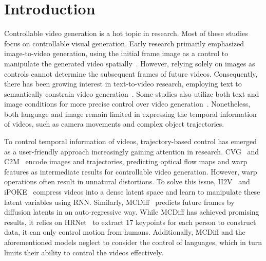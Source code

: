 \documentclass{article} %
\begin{document}
\section{Introduction}

Controllable video generation is a hot topic in research. Most of these studies focus on controllable visual generation. Early research primarily emphasized image-to-video generation, using the initial frame image as a control to manipulate the generated video spatially~\citet{lotterDeepPredictiveCoding2016,srivastavaUnsupervisedLearningVideo2015,chiappaRecurrentEnvironmentSimulators2016}. However, relying solely on images as controls cannot determine the subsequent frames of future videos. Consequently, there has been growing interest in text-to-video research, employing text to semantically constrain video generation~\citet{wuGODIVAGeneratingOpenDomaIn2021,wuUWAVisualSynthesis2022,hongCogVideoLargescalePretraining2022,singerMakeAVideoTexttoVideoGeneration2022,hoImagenVideoHigh2022}. Some studies also utilize both text and image conditions for more precise control over video generation~\citet{huMakeItMove2022,yinNUWAXLDiffusionDiffusion2023,esserStructureContentguidedVideo2023}. Nonetheless, both language and image remain limited in expressing the temporal information of videos, such as camera movements and complex object trajectories.

To control temporal information of videos, trajectory-based control has emerged as a user-friendly approach increasingly gaining attention in research. CVG~\citet{haoControllableVideoGeneration2018} and C2M~\citet{ardinoClickMoveControlling2021} encode images and trajectories, predicting optical flow maps and warp features as intermediate results for controllable video generation. However, warp operations often result in unnatural distortions. To solve this issue, II2V~\citet{blattmannUnderstandingObjectDynamics2021} and iPOKE~\citet{blattmannIpokePokingStill2021} compress videos into a dense latent space and learn to manipulate these latent variables using RNN. Similarly, MCDiff~\citet{chenMotionConditionedDiffusionModel2023} predicts future frames by diffusion latents in an auto-regressive way. While  MCDiff has achieved promising results, it relies on HRNet~\citet{wangDeepHighResolutionRepresentation2021} to extract 17 keypoints for each person to construct data, it can only control motion from humans. Additionally, MCDiff and the aforementioned models neglect to consider the control of languages, which in turn limits their ability to control the videos effectively.
\end{document}
